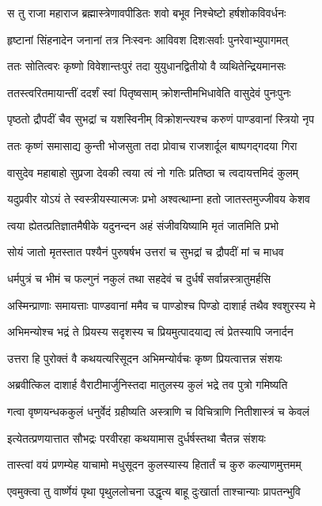 \twolineshloka
{स तु राजा महाराज ब्रह्मास्त्रेणावपीडितः}
{शवो बभूव निश्चेष्टो हर्षशोकविवर्धनः}


\twolineshloka
{हृष्टानां सिंहनादेन जनानां तत्र निःस्वनः}
{आविवश दिशःसर्वाः पुनरेवाभ्युपागमत्}


\twolineshloka
{ततः सोतित्वरः कृष्णो विवेशान्तःपुरं तदा}
{युयुधानद्वितीयो वै व्यथितेन्द्रियमानसः}


\twolineshloka
{ततस्त्वरितमायान्तीं ददर्शं स्वां पितृष्वसाम्}
{क्रोशन्तीमभिधावेति वासुदेवं पुनःपुनः}


\twolineshloka
{पृष्ठतो द्रौपदीं चैव सुभद्रां च यशस्विनीम्}
{विक्रोशन्त्यश्च करुणं पाण्डवानां स्त्रियो नृप}


\twolineshloka
{ततः कृष्णं समासाद्य कुन्ती भोजसुता तदा}
{प्रोवाच राजशार्दूल बाष्पगद्गदया गिरा}


\twolineshloka
{वासुदेव महाबाहो सुप्रजा देवकी त्वया}
{त्वं नो गतिः प्रतिष्ठा च त्वदायत्तमिदं कुलम्}


\twolineshloka
{यदुप्रवीर योऽयं ते स्वस्त्रीयस्यात्मजः प्रभो}
{अश्वत्थाम्ना हतो जातस्तमुज्जीवय केशव}


\twolineshloka
{त्वया ह्येतत्प्रतिज्ञातमैषीके यदुनन्दन}
{अहं संजीवयिष्यामि मृतं जातमिति प्रभो}


\twolineshloka
{सोयं जातो मृतस्तात पश्यैनं पुरुषर्षभ}
{उत्तरां च सुभद्रां च द्रौपदीं मां च माधव}


\twolineshloka
{धर्मपुत्रं च भीमं च फल्गुनं नकुलं तथा}
{सहदेवं च दुर्धर्षं सर्वान्नस्त्रातुमर्हसि}


\twolineshloka
{अस्मिन्प्राणाः समायत्ताः पाण्डवानां ममैव च}
{पाण्डोश्च पिण्डो दाशार्ह तथैव श्वशुरस्य मे}


\twolineshloka
{अभिमन्योश्च भद्रं ते प्रियस्य सदृशस्य च}
{प्रियमुत्पादयाद्य त्वं प्रेतस्यापि जनार्दन}


\twolineshloka
{उत्तरा हि पुरोक्तं वै कथयत्यरिसूदन}
{अभिमन्योर्वचः कृष्ण प्रियत्वात्तन्न संशयः}


\twolineshloka
{अब्रवीत्किल दाशार्ह वैराटीमार्जुनिस्तदा}
{मातुलस्य कुलं भद्रे तव पुत्रो गमिष्यति}


\twolineshloka
{गत्वा वृष्णयन्धककुलं धनुर्वेदं ग्रहीष्यति}
{अस्त्राणि च विचित्राणि नितीशास्त्रं च केवलं}


\twolineshloka
{इत्येतत्प्रणयात्तात सौभद्रः परवीरहा}
{कथयामास दुर्धर्षस्तथा चैतन्न संशयः}


\twolineshloka
{तास्त्वां वयं प्रणम्येह याचामो मधुसूदन}
{कुलस्यास्य हितार्तं च कुरु कल्याणमुत्तमम्}


\twolineshloka
{एवमुक्त्वा तु वार्ष्णेयं पृथा पृथुललोचना}
{उद्धृत्य बाहू दुःखार्ता ताश्चान्याः प्रापतन्भुवि}


